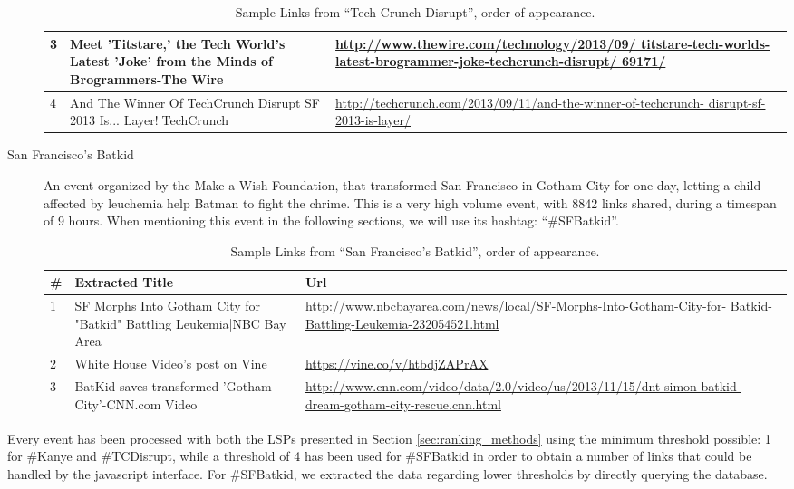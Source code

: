 \documentclass{sig-alternate}
\begin{document}
\begin{description}
\begin{table}
\begin{tabular}{| p{0.5cm} | p{3.5cm} | p{3.5cm} |}
\hline
  3 & Meet 'Titstare,' the Tech World's Latest 'Joke' from the Minds of Brogrammers-The Wire &\url{http://www.thewire.com/technology/2013/09/ titstare-tech-worlds-latest-brogrammer-joke-techcrunch-disrupt/ 69171/} \\
\hline
  4 & And The Winner Of TechCrunch Disrupt SF 2013 Is... Layer!|TechCrunch &\url{http://techcrunch.com/2013/09/11/and-the-winner-of-techcrunch- disrupt-sf-2013-is-layer/} \\
\hline
\end{tabular}
\caption{Sample Links from ``Tech Crunch Disrupt'', order of appearance.}
\label{table:tcdisrupt}
\end{table}
\item[San Francisco's Batkid] An event organized by the Make a Wish Foundation, that transformed San Francisco in Gotham City for one day, letting a child affected by leuchemia help Batman to fight the chrime. This is a very high volume event, with 8842 links shared, during a timespan of 9 hours. When mentioning this event in the following sections, we will use its hashtag: ``\#SFBatkid''.
\begin{table}
\begin{tabular}{| p{0.5cm} | p{3.5cm} | p{3.5cm} |}
  \hline
  \textbf{\#} & \textbf{Extracted Title} & \textbf{Url} \\
  \hline
  1 &SF Morphs Into Gotham City for "Batkid" Battling Leukemia|NBC Bay Area & \url{http://www.nbcbayarea.com/news/local/SF-Morphs-Into-Gotham-City-for- Batkid-Battling-Leukemia-232054521.html} \\
\hline
  2 &White House Video's post on Vine &\url{https://vine.co/v/htbdjZAPrAX} \\
\hline
  3 & BatKid saves transformed 'Gotham City'-CNN.com Video&\url{http://www.cnn.com/video/data/2.0/video/us/2013/11/15/dnt-simon-batkid- dream-gotham-city-rescue.cnn.html} \\
\hline
\end{tabular}
\caption{Sample Links from ``San Francisco's Batkid'', order of appearance.}
\label{table:sfbatkid}
\end{table}
\end{description}

Every event has been processed with both the LSPs presented in Section \ref{sec:ranking_methods} using the minimum threshold possible: 1 for \#Kanye and \#TCDisrupt, while a threshold of 4 has been used for \#SFBatkid in order to obtain a number of links that could be handled by the javascript interface. For \#SFBatkid, we extracted the data regarding lower thresholds by directly querying the database.
\end{document}
